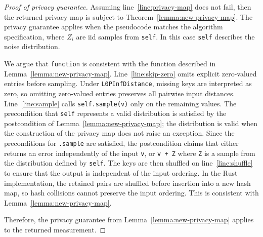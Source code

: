 \documentclass{article}
\begin{document}
\begin{proof}[Proof of privacy guarantee]
    Assuming line~\ref{line:privacy-map} does not fail,
    then the returned privacy map is subject to Theorem~\ref{lemma:new-privacy-map}.
    The privacy guarantee applies when the pseudocode matches the algorithm specification,
    where $Z_i$ are iid samples from \texttt{self}.
    In this case \texttt{self} describes the noise distribution.

    We argue that \texttt{function} is consistent with the function described in Lemma~\ref{lemma:new-privacy-map}.
    Line~\ref{line:skip-zero} omits explicit zero-valued entries before sampling.
    Under \texttt{L0PInfDistance}, missing keys are interpreted as zero, so
    omitting zero-valued entries preserves all pairwise input distances.
    Line~\ref{line:sample} calls \texttt{self.sample(v)} only on the remaining values.
    The precondition that \texttt{self} represents a valid distribution is satisfied by the postcondition of Lemma~\ref{lemma:new-privacy-map};
    the distribution is valid when the construction of the privacy map does not raise an exception.
    Since the preconditions for \texttt{.sample} are satisfied,
    the postcondition claims that either returns an error independently of the input \texttt{v},
    or \texttt{v + Z} where \texttt{Z} is a sample from the distribution defined by \texttt{self}.
    The keys are then shuffled on line~\ref{line:shuffle} to ensure that the output is independent of the input ordering.
    In the Rust implementation, the retained pairs are shuffled before insertion into a new hash map, so hash collisions cannot preserve the input ordering.
    This is consistent with Lemma~\ref{lemma:new-privacy-map}.

    Therefore, the privacy guarantee from Lemma~\ref{lemma:new-privacy-map} applies to the returned measurement.
\end{proof}
\end{document}
